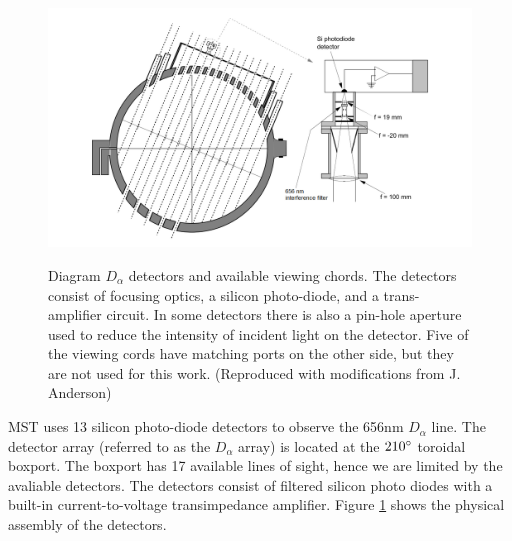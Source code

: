 \begin{figure}[!htb]
	\centering
	\includegraphics[width = 0.9\linewidth]{./implementation/d_alpha_detector.PNG}
	\label{fig:D_alpha_diagram}
	\caption[$D_{\alpha}$ detectors]{Diagram $D_{\alpha}$ detectors and available viewing chords. The detectors consist of focusing optics, a silicon photo-diode, and a trans-amplifier circuit. In some detectors there is also a pin-hole aperture used to reduce the intensity of incident light on the detector. Five of the viewing cords have matching ports on the other side, but they are not used for this work. (Reproduced with modifications from J. Anderson\cite{Anderson2001})}
\end{figure}

MST uses 13 silicon photo-diode detectors to observe the 656nm $D_\alpha$ line.  The detector array (referred to as the $D_{\alpha}$ array) is located at the $210 \degree$ toroidal boxport. The boxport has 17 available lines of sight, hence we are limited by the avaliable detectors. The detectors consist of filtered silicon photo diodes with a built-in current-to-voltage transimpedance amplifier. Figure \ref{fig:D_alpha_diagram} shows the physical assembly of the detectors.


